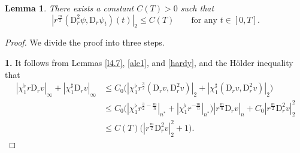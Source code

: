 \documentclass[11pt,reqno]{amsart}
\newtheorem{lem}{Lemma}[section]
\numberwithin{rk}{section}
\numberwithin{prop}{section}
\numberwithin{mydef}{section}
\numberwithin{lem}{section}
\numberwithin{equation}{section}
\numberwithin{thm}{section}
\begin{document}
 
\begin{lem}\label{lemma-psi-high}
There exists a constant $C(T)>0$ such that
\begin{equation*}
|r^\frac{m}{2}(\mathrm{D}_r^2\psi,\mathrm{D}_r \psi_t)(t)|_2\leq C(T)\qquad \text{for any $t\in [0,T]$}.
\end{equation*}
\end{lem}
\begin{proof} We divide the proof into three steps.

\smallskip
\textbf{1.} It follows from Lemmas \ref{l4.7}, \ref{ale1}, and \ref{hardy}, and the H\"older inequality that
\begin{equation}\label{vr-infty}
\begin{aligned}
|\chi_1^\flat r\mathrm{D}_r v|_\infty+|\chi_1^\sharp \mathrm{D}_r v|_\infty&\leq C_0\big(|\chi_1^\flat r^\frac{3}{2}(\mathrm{D}_r v,\mathrm{D}_r^2 v)|_2 + |\chi_1^\sharp(\mathrm{D}_r v,\mathrm{D}_r^2 v)|_2\big)\\
&\leq C_0\big(|\chi_1^\flat r^{\frac{3}{2}-\frac{m}{n}}|_{n^*}+|\chi_1^\flat r^{-\frac{m}{n}}|_{n^*}\big)|r^\frac{m}{n}\mathrm{D}_r v|_n+C_0|r^\frac{m}{2}\mathrm{D}_r^2 v|_2^2\\
&\leq C(T)\big(|r^\frac{m}{2}\mathrm{D}_r^2 v|_2^2+1\big).
\end{aligned}
\end{equation}



\end{proof}
\end{document}
